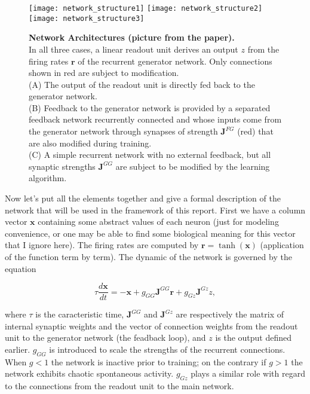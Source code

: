 \begin{figure}[H]
  \centering
  \texttt{[image: network\_structure1]}
  \hfill
  \texttt{[image: network\_structure2]}
  \hfill
  \texttt{[image: network\_structure3]}
  \caption{
    \textbf{Network Architectures (picture from the paper).}\\[0.1em]
    In all three cases, a linear readout unit derives an output $z$
    from the firing rates $\mathbf{r}$ of the recurrent generator network.
    Only connections shown in red are subject to modification.\\[0.1em]
    (A) The output of the readout unit is directly fed back to the
    generator network.\\[0.1em]
    (B) Feedback to the generator network is provided by a separated
    feedback network recurrently connected and whose inputs come from
    the generator network through synapses of strength $\mathbf{J}^{FG}$
    (red) that are also modified during training.\\[0.1em]
    (C) A simple recurrent network with no external feedback, but all
    synaptic strengths $\mathbf{J}^{GG}$ are subject to be modified by 
    the learning algorithm.
  }
  \label{fig: network_structures}
\end{figure}

Now let's put all the elements together and give a formal description of
the network that will be used in the framework of this report. First
we have a column vector $\mathbf{x}$ containing some abstract values of
each neuron (just for modeling convenience, or one may be able to find
some biological meaning for this vector that I ignore here). The firing
rates are computed by $\mathbf{r} = \tanh(\mathbf{x})$ (application of
the function term by term). The dynamic of the network is governed by
the equation

\[
  \tau \frac{d\mathbf{x}}{dt} = 
  -\mathbf{x} + g_{GG}\mathbf{J}^{GG}\mathbf{r}
  + g_{Gz} \mathbf{J}^{Gz} z,
\]

where $\tau$ is the caracteristic time, $\mathbf{J}^{GG}$ and 
$\mathbf{J}^{Gz}$ are respectively the matrix of internal synaptic 
weights and the vector of connection weights from the readout unit 
to the generator network (the feadback loop), and $z$ is the output
defined earlier. $g_{GG}$ is introduced to scale the strengths of 
the recurrent connections. When $g<1$ the network is inactive prior to
training; on the contrary if $g>1$ the network exhibits chaotic spontaneous
activity. $g_{Gz}$ plays a similar role with regard to the connections
from the readout unit to the main network.

